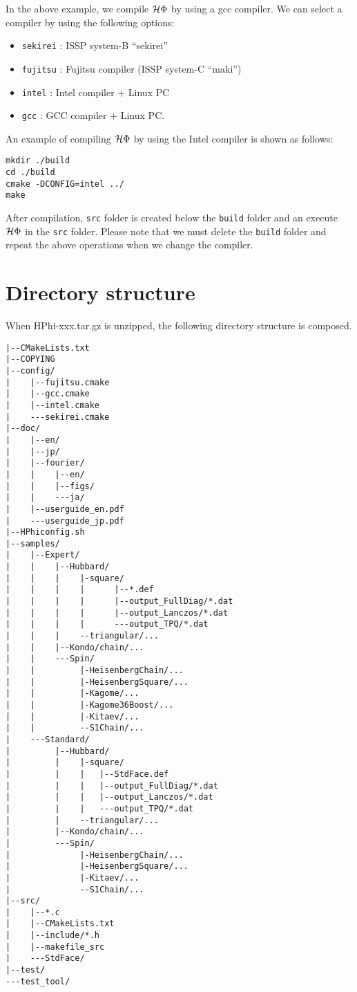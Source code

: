 In the above example,
we compile $\mathcal{H} \Phi$ by using a gcc compiler.
We can select a compiler by using the following options:
\begin{itemize}
\item \verb|sekirei| : ISSP system-B ``sekirei''
\item \verb|fujitsu| : Fujitsu compiler (ISSP system-C ``maki'')
\item \verb|intel| : Intel compiler + Linux PC
\item \verb|gcc| : GCC compiler + Linux PC.
\end{itemize}
An example of compiling $\mathcal{H} \Phi$ by using the Intel compiler is shown as follows:
\begin{verbatim}
mkdir ./build
cd ./build
cmake -DCONFIG=intel ../
make
\end{verbatim}
After compilation,
\verb|src| folder is created below the \verb|build| folder and
an execute $\mathcal{H} \Phi$ in the \verb|src| folder.
Please note that we must delete the \verb|build| folder and
repeat the above operations when we change the compiler.

\label{Sec:HowToInstall}

\section{Directory structure}
When HPhi-xxx.tar.gz is unzipped, the following directory structure is composed.
 
\begin{verbatim}
|--CMakeLists.txt
|--COPYING
|--config/
|    |--fujitsu.cmake
|    |--gcc.cmake
|    |--intel.cmake
|    ---sekirei.cmake
|--doc/
|    |--en/
|    |--jp/
|    |--fourier/
|    |    |--en/
|    |    |--figs/
|    |    ---ja/
|    |--userguide_en.pdf
|    ---userguide_jp.pdf
|--HPhiconfig.sh
|--samples/
|    |--Expert/
|    |    |--Hubbard/
|    |    |    |-square/
|    |    |    |      |--*.def
|    |    |    |      |--output_FullDiag/*.dat
|    |    |    |      |--output_Lanczos/*.dat
|    |    |    |      ---output_TPQ/*.dat
|    |    |    --triangular/...
|    |    |--Kondo/chain/...
|    |    ---Spin/
|    |         |-HeisenbergChain/...
|    |         |-HeisenbergSquare/...
|    |         |-Kagome/...
|    |         |-Kagome36Boost/...
|    |         |-Kitaev/...
|    |         --S1Chain/...
|    ---Standard/
|         |--Hubbard/
|         |    |-square/
|         |    |   |--StdFace.def
|         |    |   |--output_FullDiag/*.dat
|         |    |   |--output_Lanczos/*.dat
|         |    |   ---output_TPQ/*.dat
|         |    --triangular/...
|         |--Kondo/chain/...
|         ---Spin/
|              |-HeisenbergChain/...
|              |-HeisenbergSquare/...
|              |-Kitaev/...
|              --S1Chain/...
|--src/
|    |--*.c
|    |--CMakeLists.txt
|    |--include/*.h
|    |--makefile_src
|    ---StdFace/
|--test/
---test_tool/
\end{verbatim}

